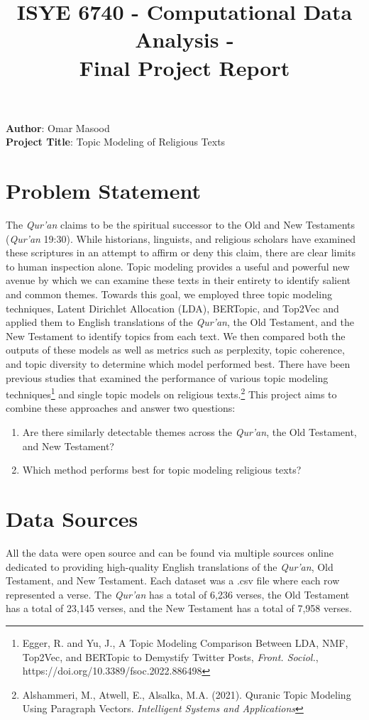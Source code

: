 \documentclass{article}
\title{\textbf{ISYE 6740 - Computational Data Analysis - \\ Final Project Report}}
\date{}
\begin{document}
\maketitle
\section*{}
    \textbf{Author}: Omar Masood \\
    \textbf{Project Title}: Topic Modeling of Religious Texts
\section{Problem Statement}
The \textit{Qur'an} claims to be the spiritual successor to the Old and New Testaments (\textit{Qur'an} 19:30). While historians, linguists, and religious scholars have examined these scriptures in an attempt to affirm or deny this claim, there are clear limits to human inspection alone. Topic modeling provides a useful and powerful new avenue by which we can examine these texts in their entirety to identify salient and common themes. Towards this goal, we employed three topic modeling techniques, Latent Dirichlet Allocation (LDA), BERTopic, and Top2Vec and applied them to English translations of the \textit{Qur'an}, the Old Testament, and the New Testament to identify topics from each text. We then compared both the outputs of these models as well as metrics such as perplexity, topic coherence, and topic diversity to determine which model performed best. There have been previous studies that examined the performance of various topic modeling techniques\footnote{Egger, R. and Yu, J., A Topic Modeling Comparison Between LDA, NMF, Top2Vec, and BERTopic to Demystify Twitter Posts, \textit{Front. Sociol.}, https://doi.org/10.3389/fsoc.2022.886498} and single topic models on religious texts.\footnote{Alshammeri, M., Atwell, E., Alsalka, M.A. (2021). Quranic Topic Modeling Using Paragraph Vectors. \textit{Intelligent Systems and Applications}} This project aims to combine these approaches and answer two questions: \begin{enumerate}
    \item Are there similarly detectable themes across the \textit{Qur'an}, the Old Testament, and New Testament?
    \item Which method performs best for topic modeling religious texts?
\end{enumerate}

\section{Data Sources}
    All the data were open source and can be found via multiple sources online dedicated to providing high-quality English translations of the \textit{Qur'an}, Old Testament, and New Testament. Each dataset was a .csv file where each row represented a verse. The \textit{Qur'an} has a total of 6,236 verses, the Old Testament has a total of 23,145 verses, and the New Testament has a total of 7,958 verses. 
 
\end{document}
